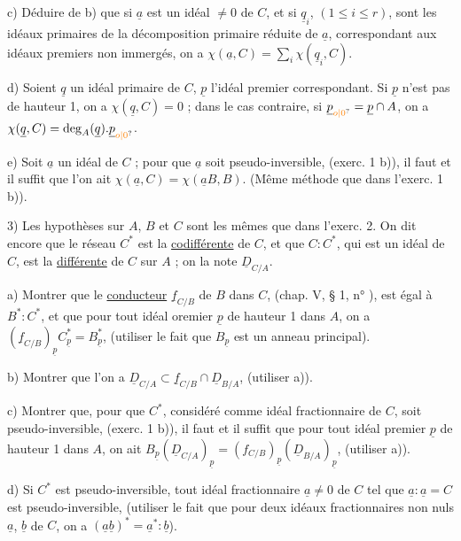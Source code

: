 c) Déduire de b) que si $\underline a$ est un idéal $\ne0$ de $C$, et si $\underline q_i$, $(1\leq i\leq r)$, sont les idéaux primaires de la décomposition primaire réduite de $\underline a$, correspondant aux idéaux premiers non immergés, on a $\chi(\underline a,C)=\sum_i\chi(\underline q_i,C)$.

d) Soient $\underline q$ un idéal primaire de $C$, $\underline p$ l'idéal premier correspondant. Si $\underline p$ n'est pas de hauteur 1, on a $\chi(\underline q,C)=0$ ; dans le cas contraire, si $\underline p_{\unsure{o|0}}=\underline p\cap A$, on a $\chi(\underline q,C)=\operatorname{deg}_A(\underline q).\underline p_{\unsure{o|0}}$.

e) Soit $\underline a$ un idéal de $C$ ; pour que $\underline a$ soit pseudo-inversible, (exerc. 1 b)), il faut et il suffit que l'on ait $\chi(\underline a,C)=\chi(\underline a B,B)$. (Même méthode que dans l'exerc. 1 b)).

3) Les hypothèses sur $A$, $B$ et $C$ sont les mêmes que dans l'exerc. 2. On dit encore que le réseau $C^*$ est la \uline{codifférente} de $C$, et que $C:C^*$, qui est un idéal de $C$, est la \uline{différente} de $C$ sur $A$ ; on la note $\underline D_{C/A}$.

a) Montrer que le \uline{conducteur} $\underline f_{C/B}$ de $B$ dans $C$, (chap. V, \S{} 1, n° \quad), est égal à $B^*:C^*$, et que pour tout idéal oremier $\underline p$ de hauteur 1 dans $A$, on a $(\underline f_{C/B})_{\underline p}C^*_{\underline p}=B^*_{\underline p}$, (utiliser le fait que $B_{\underline p}$ est un anneau principal).

b) Montrer que l'on a $\underline D_{C/A}\subset\underline f_{C/B}\cap\underline D_{B/A}$, (utiliser a)).

c) Montrer que, pour que $C^*$, considéré comme idéal fractionnaire de $C$, soit pseudo-inversible, (exerc. 1 b)), il faut et il suffit que pour tout idéal premier $\underline p$ de hauteur 1 dans $A$, on ait $B_{\underline p}(\underline D_{C/A})_{\underline p}=(f_{C/B})_{\underline p}(\underline D_{B/A})_{\underline p}$, (utiliser a)).

d) Si $C^*$ est pseudo-inversible, tout idéal fractionnaire $\underline a\ne0$ de $C$ tel que $\underline a:\underline a=C$ est pseudo-inversible, (utiliser le fait que pour deux idéaux fractionnaires non nuls $\underline a$, $\underline b$ de $C$, on a $(\underline a\underline b)^*=\underline a^*:\underline b$).
